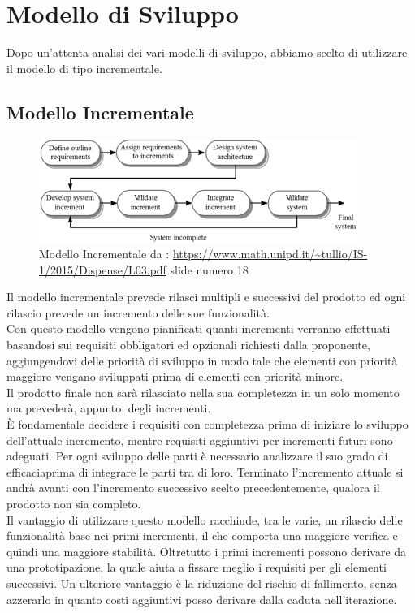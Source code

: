 \section{Modello di Sviluppo}
\label{ModelloSviluppo}

Dopo un'attenta analisi dei vari modelli di sviluppo, abbiamo  scelto di utilizzare il modello di tipo incrementale.

\subsection{Modello Incrementale}

\begin{figure}[h]
	\centering
  		\includegraphics[width=0.7\linewidth]{./images/modelloincrementale.png}
  		\caption{Modello Incrementale da : \url{https://www.math.unipd.it/~tullio/IS-1/2015/Dispense/L03.pdf} slide numero 18}
  		\label{fig:Modello Incrementale}
\end{figure}

Il modello incrementale prevede rilasci multipli e successivi del prodotto ed ogni rilascio prevede un incremento delle sue funzionalità. \\
Con questo modello vengono pianificati quanti incrementi verranno effettuati basandosi sui requisiti obbligatori ed opzionali richiesti dalla proponente, aggiungendovi delle priorità di sviluppo in modo tale che elementi con priorità maggiore vengano sviluppati prima di elementi con priorità minore.\\
Il prodotto finale non sarà rilasciato nella sua completezza in un solo momento ma prevederà, appunto, degli incrementi. \\
È fondamentale decidere i requisiti con completezza prima di iniziare lo sviluppo dell'attuale incremento, mentre requisiti aggiuntivi per incrementi futuri sono adeguati. Per ogni sviluppo delle parti è necessario analizzare il suo grado di efficacia\glossario prima di integrare le parti tra di loro. Terminato l'incremento attuale si andrà avanti con l'incremento successivo scelto precedentemente, qualora il prodotto non sia completo. \\
Il vantaggio di utilizzare questo modello racchiude, tra le varie, un rilascio delle funzionalità base nei primi incrementi, il che comporta una maggiore verifica e quindi una maggiore stabilità. Oltretutto i primi incrementi possono derivare da una prototipazione, la quale aiuta a fissare meglio i requisiti per gli elementi successivi. Un ulteriore vantaggio è la riduzione del rischio di fallimento, senza azzerarlo in quanto costi aggiuntivi posso derivare dalla caduta nell'iterazione\glossario.

